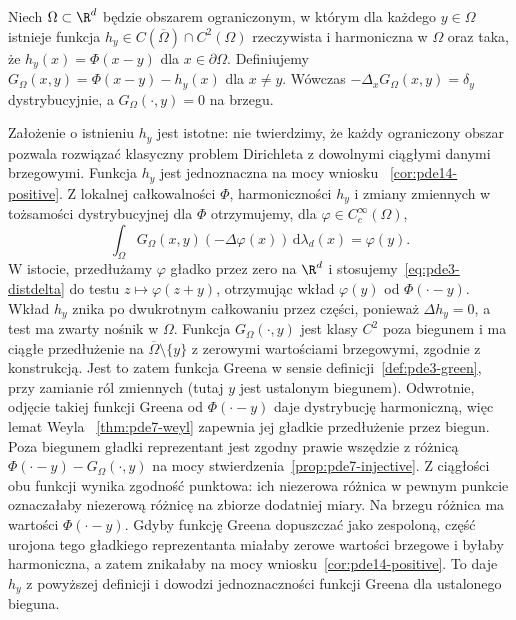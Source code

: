 \begin{definicja}
Niech $\Omega\subset\R^d$ będzie obszarem ograniczonym,
w którym dla każdego $y\in\Omega$ istnieje funkcja
$h_y\in C(\overline\Omega)\cap C^2(\Omega)$ rzeczywista
i harmoniczna w $\Omega$ oraz taka, że $h_y(x)=\Phi(x-y)$ dla
$x\in\partial\Omega$. Definiujemy
$G_\Omega(x,y)=\Phi(x-y)-h_y(x)$ dla $x\ne y$.
Wówczas $-\Delta_xG_\Omega(x,y)=\delta_y$ dystrybucyjnie,
a $G_\Omega(\cdot,y)=0$ na brzegu.
\end{definicja}
Założenie o istnieniu $h_y$ jest istotne: nie twierdzimy,
że każdy ograniczony obszar pozwala rozwiązać klasyczny
problem Dirichleta z dowolnymi ciągłymi danymi brzegowymi.
Funkcja $h_y$ jest jednoznaczna na mocy wniosku
~\ref{cor:pde14-positive}. Z lokalnej całkowalności $\Phi$,
harmoniczności $h_y$ i zmiany zmiennych w tożsamości
dystrybucyjnej dla $\Phi$ otrzymujemy, dla
$\varphi\in C_c^\infty(\Omega)$,
\[
 \int_\Omega G_\Omega(x,y)(-\Delta\varphi(x))\,
 \mathrm d\lambda_d(x)=\varphi(y).
\]
W istocie, przedłużamy $\varphi$ gładko przez zero na
$\R^d$ i stosujemy~\eqref{eq:pde3-distdelta} do testu
$z\mapsto\varphi(z+y)$, otrzymując wkład $\varphi(y)$
od $\Phi(\cdot-y)$. Wkład $h_y$ znika po dwukrotnym
całkowaniu przez części, ponieważ $\Delta h_y=0$,
a test ma zwarty nośnik w $\Omega$.
Funkcja $G_\Omega(\cdot,y)$ jest klasy $C^2$ poza biegunem
i ma ciągłe przedłużenie na $\overline\Omega\setminus\{y\}$
z zerowymi wartościami brzegowymi, zgodnie z konstrukcją. Jest to zatem funkcja Greena
w sensie definicji~\ref{def:pde3-green}, przy zamianie
ról zmiennych (tutaj $y$ jest ustalonym biegunem).
Odwrotnie, odjęcie takiej funkcji Greena od $\Phi(\cdot-y)$
daje dystrybucję harmoniczną, więc lemat Weyla
~\ref{thm:pde7-weyl} zapewnia jej gładkie przedłużenie
przez biegun. Poza biegunem gładki reprezentant jest zgodny
prawie wszędzie z różnicą $\Phi(\cdot-y)-G_\Omega(\cdot,y)$
na mocy stwierdzenia~\ref{prop:pde7-injective}.
Z ciągłości obu funkcji wynika zgodność punktowa:
ich niezerowa różnica w pewnym punkcie oznaczałaby
niezerową różnicę na zbiorze dodatniej miary.
Na brzegu różnica ma wartości $\Phi(\cdot-y)$.
Gdyby funkcję Greena dopuszczać jako zespoloną, część
urojona tego gładkiego reprezentanta miałaby zerowe
wartości brzegowe i byłaby harmoniczna, a zatem
znikałaby na mocy wniosku~\ref{cor:pde14-positive}. To daje $h_y$ z powyższej
definicji i dowodzi jednoznaczności funkcji Greena
dla ustalonego bieguna.

